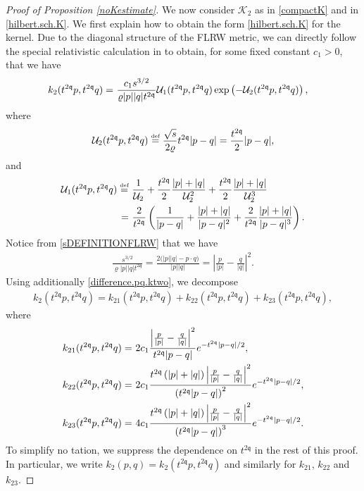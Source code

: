 \documentclass[reqno]{amsart}
\newcommand{\eqdef }{\overset{\mbox{\tiny{def}}}{=}}
\newcommand{\pv}{p}
\newcommand{\pZ}{|\pv|}
\newcommand{\qv}{q}
\newcommand{\qZ}{|\qv|}
\newcommand{\qq}{\mathfrak{q}}
\newcommand{\tqq}{t^{2\qq}}
\newcommand{\compK}{\mathcal{K}}
\newcommand{\kerU}{\mathcal{U}}
\newcommand{\mrel}{\varrho}
\theoremstyle{definition}
\numberwithin{equation}{section}
\numberwithin{theorem}{section}
\begin{document}
\begin{proof}[Proof of Proposition \ref{noKestimate}]
  
We now consider $\compK_{2}$ as in \eqref{compactK} and in \eqref{hilbert.sch.K}.   We first explain how to obtain the form \eqref{hilbert.sch.K} for the kernel. Due to the diagonal structure of the FLRW metric, we can directly follow the special relativistic calculation in \cite[Appendix, starting on page 588]{MR2728733} to obtain, for some fixed constant $c_1>0$, that we have 
\begin{align}\notag 
    k_2(\tqq p,\tqq q) = &~
\frac {c_1 s^{3/2}}{\mrel{\pZ}{\qZ}\tqq}
\kerU_1(\tqq p,\tqq q)
 \exp\left( -\kerU_2(\tqq p,\tqq q)\right),
\end{align}
where 
\begin{equation}\notag 
\kerU_2(\tqq p, \tqq q)  \eqdef \frac{ \sqrt{s}}{2\mrel}\tqq|p-q|= \frac{\tqq}{2}|p-q|,    
\end{equation}
and
\begin{align}\notag  
    \kerU_1(\tqq p,\tqq q)\eqdef &~ \frac{1}{\kerU_2}+\frac{\tqq}{2}\frac{{\pZ}+{\qZ}}{\kerU_2^2}+\frac{\tqq}{2}\frac{{\pZ}+{\qZ}}{\kerU_2^3}
    \\
    =  &~
    \frac{2}{\tqq }\left(\frac{1}{|p-q|}+\frac{{\pZ}+{\qZ}}{|p-q|^2}
+
\frac{2}{\tqq}\frac{{\pZ}+{\qZ}}{ |p-q|^3}\right).\nonumber
\end{align}
Notice from \eqref{sDEFINITIONFLRW} that we have
\begin{align}\label{difference.pq.ktwo}
    \frac {s^{3/2}}{\mrel{\pZ}{\qZ}\tqq}
        =
    \frac{2\big(\pZ\qZ - p\cdot q\big)}{{\pZ}{\qZ}}
    =
\left| \frac{\pv}{\pZ} -\frac{\qv}{\qZ}\right|^2.
\end{align}
Using additionally \eqref{difference.pq.ktwo}, 
we  decompose
\begin{align*}
    k_2(\tqq p,\tqq q)=k_{21}(\tqq p,\tqq q)+k_{22}(\tqq p ,\tqq q)+k_{23}(\tqq p,\tqq q),
\end{align*}
where
\begin{align}\notag
k_{21}(\tqq p,\tqq q)= &~
2c_1
\frac{\left| \frac{\pv}{\pZ} -\frac{\qv}{\qZ}\right|^2}{\tqq|p-q|}
 e^{- \tqq|p-q|/2},
 \\ \label{k2def}
 k_{22}(\tqq p,\tqq q)= &~
2c_1
\frac{\tqq\left(|\pv|+|\qv|\right)\left| \frac{\pv}{\pZ} -\frac{\qv}{\qZ}\right|^2}{\left(\tqq|p-q|\right)^2}
 e^{- \tqq|p-q|/2},
 \\ \notag
  k_{23}(\tqq p,\tqq q)= &~
4c_1
\frac{\tqq\left(|\pv|+|\qv|\right)\left| \frac{\pv}{\pZ} -\frac{\qv}{\qZ}\right|^2}{\left(\tqq|p-q|\right)^3}
 e^{- \tqq|p-q|/2}.
\end{align}
 To simplify no tation, we suppress the dependence on $\tqq$ in the rest of this proof. In particular, we write $k_2(p,q)=k_2(\tqq p, \tqq q)$ and similarly for $k_{21}$, $k_{22}$ and $k_{23}$.



\end{proof}
\end{document}
